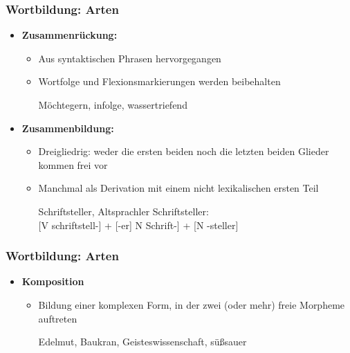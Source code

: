 \begin{frame}
\frametitle{Wortbildung: Arten}

\begin{itemize}
\item \textbf{Zusammenrückung:}

\begin{itemize}
\item Aus syntaktischen Phrasen hervorgegangen
\item Wortfolge und Flexionsmarkierungen werden beibehalten

\ea Möchtegern, infolge, wassertriefend
\z

\end{itemize}

\item \textbf{Zusammenbildung:}

\begin{itemize}
\item Dreigliedrig: weder die ersten beiden noch die letzten beiden Glieder kommen frei vor
\item Manchmal als Derivation mit einem nicht lexikalischen ersten Teil

\eal 
\ex Schriftsteller, Altsprachler
\ex Schriftsteller: \\ {[}V schriftstell-{]} + {[}-er{]} \vs {[}N Schrift-{]} + {[}N -steller{]}
\zl

\end{itemize}
\end{itemize}


\end{frame}


\begin{frame}
\frametitle{Wortbildung: Arten}

\begin{itemize}
\item \textbf{Komposition}

\begin{itemize}
\item Bildung einer komplexen Form, in der zwei (oder mehr) freie Morpheme auftreten

\ea Edelmut, Baukran, Geisteswissenschaft, süßsauer
\z

\end{itemize}

\end{itemize}

\end{frame}

